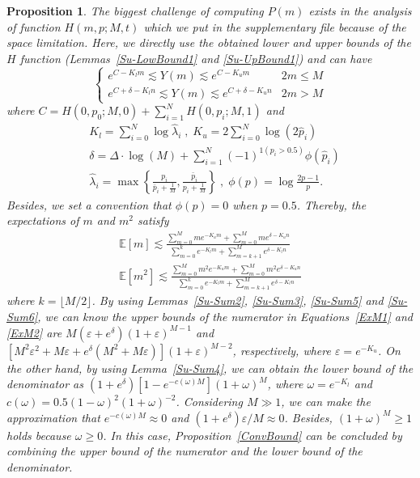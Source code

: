 \documentclass{article}
\makeatletter
\newtheorem{proposition}[theorem]{Proposition}
\renewenvironment{proof}[1][\proofname]{\par
  \vspace{-\topsep}%
  \pushQED{\qed}%
  \normalfont
  \topsep0pt \partopsep0pt %
  \trivlist
  \item[\hskip\labelsep
        \itshape
    #1\@addpunct{.}]\ignorespaces
}{%
  \popQED\endtrivlist\@endpefalse
  \addvspace{0pt plus 0pt} %
}
\makeatother
\begin{document}
\begin{proposition}
\begin{proof}
The biggest challenge of computing $P(m)$ exists in the analysis of function $H(m,p;M,t)$ which we put in the supplementary file because of the space limitation. 
Here, we directly use the obtained lower and upper bounds of the $H$ function (Lemmas~\ref{Su-LowBound1} and \ref{Su-UpBound1}) and can have
\begin{equation}
\left\{
\begin{array}{lc}
e^{C-{K}_l m}\lesssim Y(m) \lesssim e^{C-K_u m} & 2m\leq M\\
e^{C+\delta-{K}_l  n}\lesssim Y(m) \lesssim e^{C+\delta-K_u n} & 2m>M
\end{array}
\right.
\end{equation}
where $C=H(0,p_0;M,0)+\sum_{i=1}^{N}H(0,p_i;M,1)$ and
\begin{equation*}
\begin{split}
&K_l = {\sum}_{i=0}^{N}\log \hat{\lambda}_{i}\;,\; K_u =  2{\sum}_{i=0}^{N}\log \left(2\hat{p}_i\right)\\
&\delta = \Delta\cdot \log(M)+{\sum}_{i=1}^{N}(-1)^{1(p_i>0.5)}\phi(\hat{p}_i)\\
&\hat{\lambda}_i=\max\left\{\frac{p_i}{\bar{p}_i+\frac{1}{M}},\frac{\bar{p}_i}{p_i+\frac{1}{M}}\right\}
\;,\;\phi (p) =\log\frac{2p-1}{p}.
\end{split}
\end{equation*}
Besides, we set a convention that $\phi(p)=0$ when $p=0.5$. Thereby, the expectations of $m$ and $m^2$ satisfy
\begin{align}
\mathbb{E}[m] \lesssim \frac{\sum_{m=0}^{M}me^{-K_u m}+\sum_{m=0}^{M}me^{\delta-K_u n}}{\sum_{m=0}^{k}e^{-K_l m}+\sum_{m=k+1}^{M}e^{\delta-K_l n}}
\label{ExM1}\\
\mathbb{E}[m^2] \lesssim \frac{\sum_{m=0}^{M}m^2e^{-K_u m}+\sum_{m=0}^{M}m^2e^{\delta-K_u n}}{\sum_{m=0}^{k}e^{-K_l m}+\sum_{m=k+1}^{M}e^{\delta-K_l n}} \label{ExM2}
\end{align}
where $k=\lfloor M/2 \rfloor$.
By using Lemmas~\ref{Su-Sum2}, \ref{Su-Sum3}, \ref{Su-Sum5} and \ref{Su-Sum6}, we can know the upper bounds of the numerator in Equations~\ref{ExM1} and \ref{ExM2} are $M(\varepsilon+e^{\delta})(1+\varepsilon)^{M-1}$ and $[M^2\varepsilon^2+M\varepsilon+e^{\delta}(M^2+M\varepsilon)](1+\varepsilon)^{M-2}$, respectively, where $\varepsilon=e^{-K_u}$. On the other hand, by using Lemma~\ref{Su-Sum4}, we can obtain the lower bound of the denominator as $(1+e^{\delta})[1-e^{-c(\omega)M}](1+\omega)^{M}$, where $\omega=e^{-K_l}$ and $c(\omega)=0.5(1-\omega)^2(1+\omega)^{-2}$.
Considering $M\gg 1$, we can make the approximation that $e^{-c(\omega)M}\approx 0$ and $(1+e^\delta)\varepsilon/M\approx 0$. Besides, $(1+\omega)^{M}\geq 1$ holds because $\omega\geq 0$. In this case, Proposition~\ref{ConvBound} can be concluded by combining the upper bound of the numerator and the lower bound of the denominator.

\end{proof}
\end{proposition}
\end{document}
